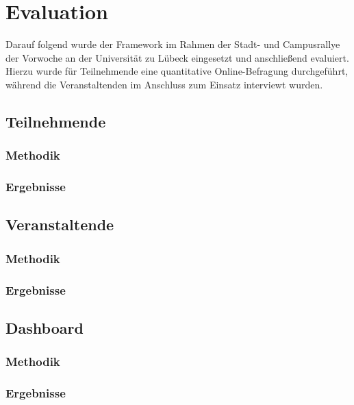 \chapter{Evaluation} \label{chapter:evaluation}

Darauf folgend wurde der Framework im Rahmen der Stadt- und Campusrallye der
Vorwoche an der Universität zu Lübeck eingesetzt und anschließend evaluiert.
Hierzu wurde für Teilnehmende eine quantitative Online-Befragung durchgeführt,
während die Veranstaltenden im Anschluss zum Einsatz interviewt wurden.

\section{Teilnehmende}

\subsection{Methodik}


\subsection{Ergebnisse}

\section{Veranstaltende}

\subsection{Methodik}

\subsection{Ergebnisse}


\section{Dashboard}

\subsection{Methodik}

\subsection{Ergebnisse}